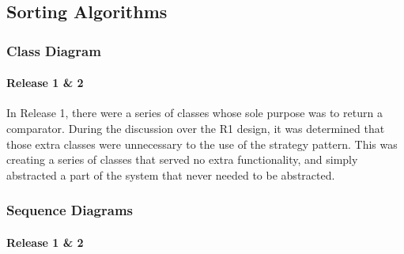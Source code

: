 \newpage

\subsection{Sorting Algorithms}

\subsubsection{Class Diagram}

\paragraph{Release 1 \& 2}

\indent
In Release 1, there were a series of classes whose sole purpose was to return a comparator.
During the discussion over the R1 design, it was determined that those extra classes were unnecessary to the use of the strategy pattern.
This was creating a series of classes that served no extra functionality, and simply abstracted a part of the system that never needed to be abstracted.

\begin{center}
\end{center}

\newpage

\subsubsection{Sequence Diagrams}

\paragraph{Release 1 \& 2}

